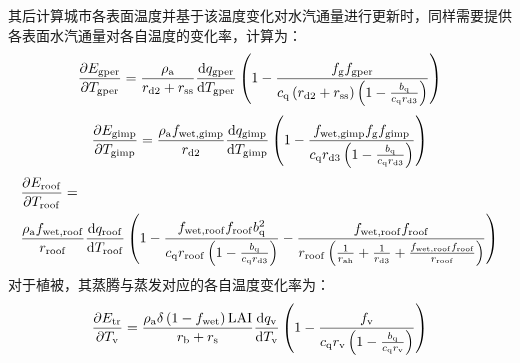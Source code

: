 其后计算城市各表面温度并基于该温度变化对水汽通量进行更新时，同样需要提供各表面水汽通量对各自温度的变化率，计算为：
\begin{equation}
  \frac{\partial  E_{\mathrm{gper}}}{\partial T_{\mathrm{gper}}} = \frac{\rho _{\rm a}}{r_{\mathrm{d2}}+r_{\mathrm{ss}}} \frac{{\mathrm {d}} q_{\mathrm{gper}}}{{\mathrm {d}} T_{\mathrm{gper}}} \left(1-\frac{f_{\mathrm{g}}f_{\mathrm{gper}}}{c_{\mathrm{q}} \left(r_{\mathrm{d2}}+r_{\mathrm{ss}}\right) \left(1-\frac{b_{\mathrm{q}}}{c_{\mathrm{q}} r_{\mathrm{d3}}}\right)}\right)
\end{equation}
%
\begin{equation}
  \frac{\partial  E_{\mathrm{gimp}}}{\partial T_{\mathrm{gimp}}} = \frac{\rho _{\rm a} f_{\mathrm{wet,gimp}}}{r_{\mathrm{d2}}} \frac{{\mathrm {d}} q_{\mathrm{gimp}}}{{\mathrm {d}} T_{\mathrm{gimp}}} \left(1-\frac{f_{\mathrm{wet,gimp}} f_{\mathrm{g}} f_{\mathrm{gimp}}}{c_{\mathrm{q}} r_{\mathrm{d3}}\left(1-\frac{b_{\mathrm{q}}}{c_{\mathrm{q}} r_{\mathrm{d3}}}\right)}\right)
\end{equation}
%
%
\begin{equation}
  \begin{split}
    & \frac{\partial  E_{\mathrm{roof}}}{\partial T_{\mathrm{roof}}} =\\
    &\frac{\rho _{\rm a} f_{\mathrm{wet,roof}}}{r_{\mathrm{roof}}} \frac{{\mathrm {d}} q_{\mathrm{roof}}}{{\mathrm {d}} T_{\mathrm{roof}}} \left(1-\frac{f_{\mathrm{wet,roof}}f_{\mathrm{roof}} b_{\mathrm{q}}^2}{c_{\mathrm{q}} r_{\mathrm{roof}} \left(1-\frac{b_{\mathrm{q}}}{c_{\mathrm{q}} r_{\mathrm{d3}}}\right)}-\frac{f_{\mathrm{wet,roof}}f_{\mathrm{roof}}}{r_{\mathrm{roof}}\left(\frac{1}{r_{\mathrm{ah}}}+\frac{1}{r_{\mathrm{d3}}}+\frac{f_{\mathrm{wet,roof}} f_{\mathrm{roof}}}{r_{\mathrm{roof}}}\right)}\right)
  \end{split}
\end{equation}
%
对于植被，其蒸腾与蒸发对应的各自温度变化率为：
%
\begin{equation}
  \frac{\partial  E_{\mathrm{tr}}}{\partial T_{\mathrm{v}}} = \frac{\rho _{\rm a} \delta \left(1-f_{\mathrm{wet}}\right){\rm LAI}} {r_{\mathrm{b}}+r_{\rm s}} \frac{{\mathrm {d}} q_{\mathrm{v}}}{{\mathrm {d}} T_{\mathrm{v}}} \left(1-\frac{f_{\mathrm{v}}}{c_{\mathrm{q}} r_{\mathrm{v}}\left(1-\frac{b_{\mathrm{q}}}{c_{\mathrm{q}} r_{\mathrm{v}}}\right)}\right)
\end{equation}

